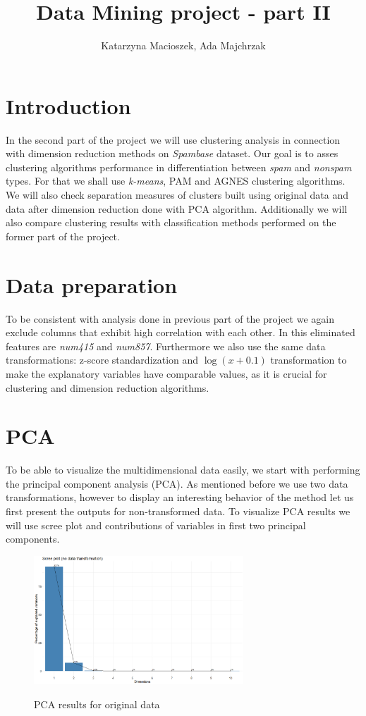 \documentclass{article}
\author{Katarzyna Macioszek, Ada Majchrzak}
\title{Data Mining project - part II}
\begin{document}
	\maketitle
	
	\section{Introduction}
	In the second part of the project we will use clustering analysis in connection with dimension reduction methods on \textit{Spambase} dataset. Our goal is to asses clustering algorithms performance in differentiation between \textit{spam} and \textit{nonspam} types. For that we shall use \textit{k-means}, PAM and AGNES clustering algorithms. We will also check separation measures of clusters built using original data and data after dimension reduction done with PCA algorithm. Additionally we will also compare clustering results with classification methods performed on the former part of the project.
	
	\section{Data preparation}
	To be consistent with analysis done in previous part of the project we again exclude columns that exhibit high correlation with each other. In this eliminated features are \textit{num415} and \textit{num857}. Furthermore we also use the same data transformations: z-score standardization and $\log(x+0.1)$ transformation to make the explanatory variables have comparable values, as it is crucial for clustering and dimension reduction algorithms.
	
	\section{PCA}
	To be able to visualize the multidimensional data easily, we start with performing the principal component analysis (PCA). As mentioned before we use two data transformations, however to display an interesting behavior of the method let  us first present the outputs for non-transformed data. To visualize PCA results we will use scree plot and contributions of variables in first two principal components.
	
	\begin{figure}[h]
		\caption{PCA results for original data}
		\centering
		\includegraphics[width=0.7\textwidth]{"proj2_plots/screeplot1.png"}
		\label{fig::screeplot}
	\end{figure}
	
\end{document}
